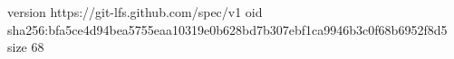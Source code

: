 version https://git-lfs.github.com/spec/v1
oid sha256:bfa5ce4d94bea5755eaa10319e0b628bd7b307ebf1ca9946b3c0f68b6952f8d5
size 68
